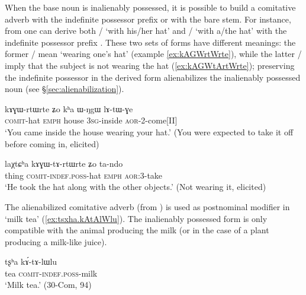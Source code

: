 When the base noun is  inalienably possessed, it is possible to build a comitative adverb with the indefinite possessor prefix or with the bare stem. For instance, from  one can derive both  /  `with his/her hat' and  /   `with a/the hat' with the indefinite possessor prefix . These two sets of forms have different meanings: the former  /  mean `wearing one's hat' (example \ref{ex:kAGWrtWrte}), while the latter  /   imply that the subject is not wearing the hat (\ref{ex:kAGWtArtWrte}); preserving the indefinite possessor in the derived form alienabilizes the inalienably possessed noun (see §\ref{sec:alienabilization}).

\begin{exe}
\ex \label{ex:kAGWrtWrte}
\gll kɤɣɯ-rtɯ\tld{}rte ʑo kʰa ɯ-ŋgɯ lɤ-tɯ-ɣe \\
\textsc{comit}-hat \textsc{emph} house \textsc{3sg}-inside \textsc{aor}-2-come[II] \\
\glt `You came inside the house wearing your hat.' (You were expected to take it off before coming in, elicited)
\end{exe}

\begin{exe}
\ex \label{ex:kAGWtArtWrte}
\gll  laχtɕʰa kɤɣɯ-tɤ-rtɯ\redp{}rte ʑo ta-ndo \\
thing \textsc{comit}-\textsc{indef}.\textsc{poss}-hat \textsc{emph} \textsc{aor}:3\flobv{}-take \\
\glt `He took the hat along with the other objects.' (Not wearing it, elicited)
\end{exe}

The alienabilized comitative adverb  (from ) is used as postnominal modifier in `milk tea' (\ref{ex:tsxha.kAtAlWlu}). The inalienably possessed form  is only compatible with the animal producing the milk (or in the case of a plant producing a milk-like juice).

\begin{exe}
\ex \label{ex:tsxha.kAtAlWlu}
\gll   tʂʰa kɤ́-tɤ-lɯ\redp{}lu \\
 tea \textsc{comit}-\textsc{indef}.\textsc{poss}-milk \\
\glt  `Milk tea.'  (30-Com, 94)
\end{exe}

